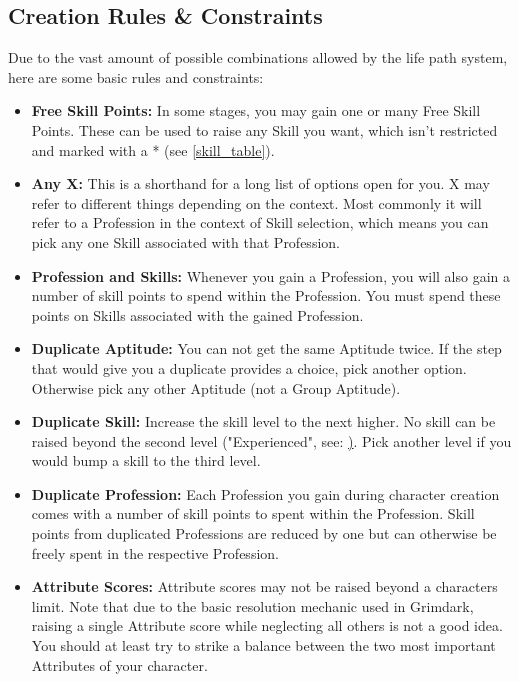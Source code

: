 \subsection{Creation Rules \& Constraints}
	Due to the vast amount of possible combinations allowed by the life path system, here are some basic rules and constraints:
	\begin{itemize}
		\item \textbf{Free Skill Points:} In some stages, you may gain one or many Free Skill Points. These can be used to raise any Skill you want, which isn't restricted and marked with a * (see \ref{skill_table}).
		\item \textbf{Any X:} This is a shorthand for a long list of options open for you. X may refer to different things depending on the context. Most commonly it will refer to a Profession in the context of Skill selection, which means you can pick any one Skill associated with that Profession.
		\item \textbf{Profession and Skills:} Whenever you gain a Profession, you will also gain a number of skill points to spend within the Profession. You must spend these points on Skills associated with the gained Profession.
		\item \textbf{Duplicate Aptitude:} You can not get the same Aptitude twice. If the step that would give you a duplicate provides a choice, pick another option. Otherwise pick any other Aptitude (not a Group Aptitude).
		\item \textbf{Duplicate Skill:} Increase the skill level to the next higher. No skill can be raised beyond the second level ("Experienced", see: \href{skill_level}). Pick another level if you would bump a skill to the third level.
		\item \textbf{Duplicate Profession:} Each Profession you gain during character creation comes with a number of skill points to spent within the Profession. Skill points from duplicated Professions are reduced by one but can otherwise be freely spent in the respective Profession.
		\item \textbf{Attribute Scores:} Attribute scores may not be raised beyond a characters limit. Note that due to the basic resolution mechanic used in Grimdark, raising a single Attribute score while neglecting all others is not a good idea. You should at least try to strike a balance between the two most important Attributes of your character.

	\end{itemize}

